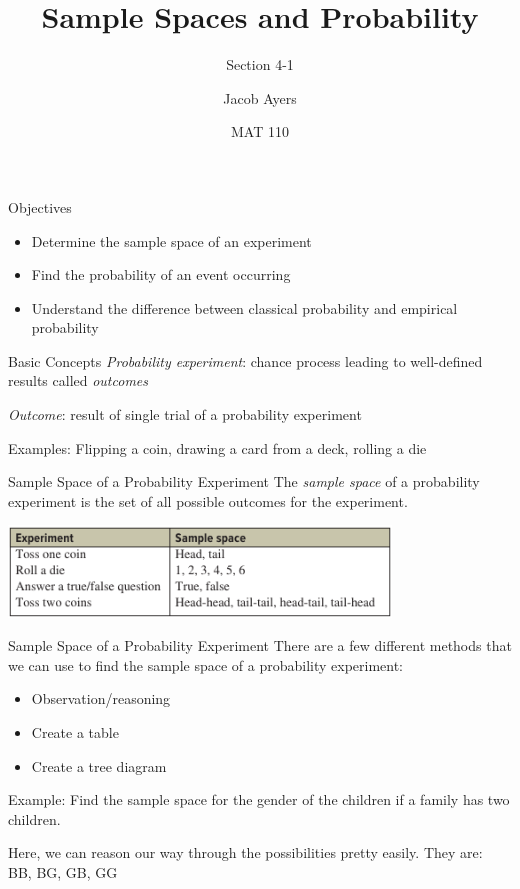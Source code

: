 \documentclass[t, aspectratio=169]{beamer}
\title[4-1]{Sample Spaces and Probability}
\subtitle{Section 4-1}
\author{Jacob Ayers}
\institute{Lesson \#9}
\date{MAT 110}
\newcommand{\?}{\stackrel{?}{=}}
\begin{document}
	
	\begin{frame}
		\titlepage
	\end{frame}
	
	\begin{frame}{Objectives}
		\begin{itemize}
			\item Determine the sample space of an experiment
			\item Find the probability of an event occurring
			\item Understand the difference between classical probability and empirical probability
		\end{itemize}
	\end{frame}

	\begin{frame}{Basic Concepts}
		\textit{Probability experiment}: chance process leading to well-defined results called \textit{outcomes} \pause
		
		\textit{Outcome}: result of single trial of a probability experiment \pause
		
		Examples: Flipping a coin, drawing a card from a deck, rolling a die
	\end{frame}

	\begin{frame}{Sample Space of a Probability Experiment}
		The \textit{sample space} of a probability experiment is the set of all possible outcomes for the experiment. \pause
		
		\includegraphics[width=4in]{ss-ex.png}
	\end{frame}

	\begin{frame}{Sample Space of a Probability Experiment}
		There are a few different methods that we can use to find the sample space of a probability experiment: \begin{itemize}
			\item Observation/reasoning
			\item Create a table
			\item Create a tree diagram
		\end{itemize} \pause
	
		Example: Find the sample space for the gender of the children if a family has two children. \pause
		
		Here, we can reason our way through the possibilities pretty easily. \pause They are: \\
		BB, BG, GB, GG
	\end{frame}
\end{document}
